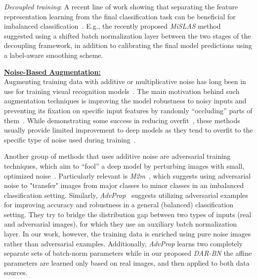 \documentclass[nohyperref]{article}
\theoremstyle{plain}
\theoremstyle{definition}
\theoremstyle{remark}
\begin{document}
\noindent \textit{Decoupled training}: A recent line of work showing that separating the feature representation learning from the final classification task can be beneficial for imbalanced classification~\cite{kang2019decoupling,zhou2020bbn,wang2021contrastive}. E.g., the recently proposed \textit{MiSLAS} method~\cite{zhong2021improving} suggested using a shifted batch normalization layer between the two stages of the decoupling framework, in addition to calibrating the final model predictions using a label-aware smoothing scheme.

\noindent \textbf{\underline{Noise-Based Augmentation:}} \\
Augmenting training data with additive or multiplicative noise has long been in use for training visual recognition models~\cite{holmstrom1992using, bengio2011deep, ding2016convolutional}. The main motivation behind such augmentation techniques is improving the model robustness to noisy inputs and 
preventing its fixation
on specific input features by randomly “occluding” parts of them~\cite{lopes2019improving}. While 
demonstrating some success in reducing overfit~\cite{zur2009noise}, these methods usually provide limited improvement to deep models as they tend to overfit to the specific type of noise used during training~\cite{yin2015noisy}.

Another group of methods that uses additive noise are adversarial training techniques, which aim to “fool” a deep model by perturbing images with small, optimized noise~\cite{goodfellow2014explaining, kurakin2016adversarial}. Particularly relevant is \textit{M2m}~\cite{kim2020m2m}, which  suggests using adversarial noise to "transfer" images from major classes to minor classes in an imbalanced classification setting. Similarly, \textit{AdvProp}~\cite{xie2020adversarial} suggests utilizing adversarial examples for improving accuracy and robustness in a general (balanced) classification setting. 
They try to bridge the distribution gap between two types of inputs (real and adversarial images), for which they use an auxiliary batch normalization layer. 
In our work, however, the training data is enriched using pure noise images rather than adversarial examples. Additionally, \textit{AdvProp} learns two completely separate sets of batch-norm parameters while in our proposed \textit{DAR-BN} the affine parameters are learned only based on real images, and then applied to both data sources.  
\end{document}
